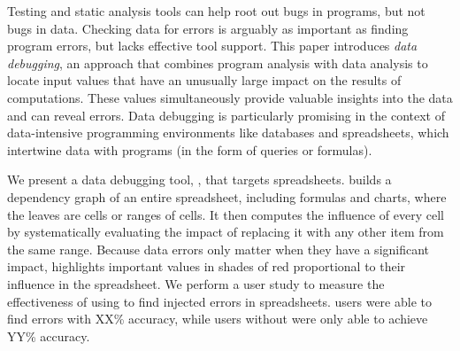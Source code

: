 Testing and static analysis tools can help root out bugs in programs,
but not bugs in data. Checking data for errors is arguably as
important as finding program errors, but lacks effective tool
support.
This paper introduces \emph{data debugging}, an approach that combines
program analysis with data analysis to locate input values that have
an unusually large impact on the results of computations. These values
simultaneously provide valuable insights into the data and can reveal
errors.  Data debugging is particularly promising in the context of
data-intensive programming environments like databases and
spreadsheets, which intertwine data with programs (in the form of
queries or formulas).

We present a data debugging tool, \checkcell{}, that targets
spreadsheets. \checkcell{} builds a dependency graph of an entire
spreadsheet, including formulas and charts, where the leaves are cells
or ranges of cells. It then computes the influence of every cell by
systematically evaluating the impact of replacing it with any other
item from the same range. Because data errors only matter when they
have a significant impact, \checkcell{} highlights important values in
shades of red proportional to their influence in the spreadsheet.  We
perform a user study to measure the effectiveness of using
\checkcell{} to find injected errors in spreadsheets. \checkcell{} users
were able to find errors with XX\% accuracy, while users without
\checkcell{} were only able to achieve YY\% accuracy.
